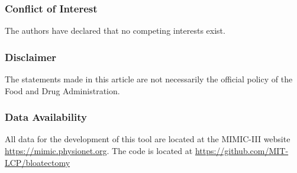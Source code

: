 \documentclass[runningheads,a4paper]{llncs}
\begin{document}
\subsubsection{Conflict of Interest}
The authors have declared that no competing interests exist.

\subsubsection{Disclaimer}
The statements made in this article are not necessarily the official policy of the Food and Drug Administration.

\subsubsection{Data Availability}
All data for the development of this tool are located at the MIMIC-III website \url{https://mimic.physionet.org}. The code is located at \url{https://github.com/MIT-LCP/bloatectomy} 
\end{document}
